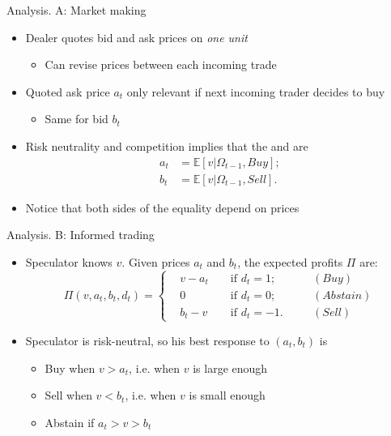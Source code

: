 \begin{frame}{Analysis. A: Market making}
\begin{itemize}
	\item Dealer quotes bid and ask prices on \textit{one unit}
	\begin{itemize}
		\item Can revise prices between each incoming trade
	\end{itemize}
	\item Quoted ask price $a_t$ only relevant if next incoming trader decides to buy
	\begin{itemize}
		\item Same for bid $b_t$
	\end{itemize}
	\item Risk neutrality and competition implies that the  and  are
	\begin{align*}
		a_t & = \mathbb{E}[v|\Omega_{t-1}, Buy]; \\
		b_t &= \mathbb{E}[v|\Omega_{t-1},  Sell].
	\end{align*}
	\item Notice that both sides of the equality depend on prices
\end{itemize}
\end{frame}


\begin{frame}{Analysis. B: Informed trading}
\begin{itemize}
	\item Speculator knows $v$. Given prices $a_t$ and $b_t$, the expected profits $\Pi$ are:
	\begin{equation*}
		\Pi(v,a_t,b_t,d_t)= \left\{
		\begin{aligned}
		&v - a_t  	&& \text{ if } d_t=1; \quad && (Buy)\\
		&0			&&\text{ if } d_t=0; \quad && (Abstain)\\
		&b_t - v 	&& \text{ if } d_t=-1. \quad && (Sell)
		\end{aligned}
		\right.
	\end{equation*}
	\item Speculator is risk-neutral, so his best response to $(a_t,b_t)$ is
	\begin{itemize}
		\item Buy when $v > a_t$, i.e. when $v$ is large enough
		\item Sell when $v<b_t$, i.e. when $v$ is small enough
		\item Abstain if $a_t > v > b_t$
	\end{itemize}
\end{itemize}
\end{frame}


